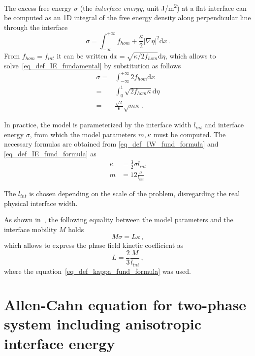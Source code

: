 The excess free energy $\sigma$ (the \textit{interface energy}, unit \unit{\J/\m^2}) at a flat interface can be computed as an 1D integral of the free energy density  along perpendicular line through the interface
\begin{equation} \label{eq_def_IE_fundamental}
	\sigma = \int_{-\infty}^{+\infty} f_{hom} + \frac{\kappa}{2}|\nabla\eta|^2 \mathrm{d}x \,.
\end{equation}
From $f_{hom}=f_{int}$ it can be written $\mathrm{d}x = \sqrt{\kappa/2 f_{hom}}\mathrm{d}\eta$, which allows to solve~\eqref{eq_def_IE_fundamental} by substitution as follows
\begin{align} 
	\sigma =& \int_{-\infty}^{+\infty} 2f_{hom} \mathrm{d}x \\
			=& \int_{0}^{1} \sqrt{2 f_{hom}\kappa} \mathrm{d}\eta \\ 
\label{eq_def_IE_fund_formula}			
			=& \frac{\sqrt{2}}{6}\sqrt{m\kappa}  \,. 
\end{align}

In practice, the model is parameterized by the interface width $l_{int}$ and interface energy $\sigma$, from which the model parameters $m,\kappa $ must be computed. The necessary formulas are obtained from \eqref{eq_def_IW_fund_formula} and \eqref{eq_def_IE_fund_formula} as
\begin{align}
\label{eq_def_kappa_fund_formula} 	\kappa 	&= \frac{3}{2}\sigma l_{int} \\
			m 		&= 12\frac{\sigma}{l_{int}}
\end{align}

The $l_{int}$ is chosen depending on the scale of the problem, disregarding the real physical interface width. 

As shown in~\cite{Moelans2008}, the following equality between the model parameters and the interface mobility $M$ holds
\begin{equation}
	M\sigma = L\kappa \,,
\end{equation}
which allows to express the phase field kinetic coefficient as
\begin{equation}\label{eq_def_L_fund_formula}
	L = \frac{2}{3}\frac{M}{l_{int}}\,,
\end{equation}
where the equation~\eqref{eq_def_kappa_fund_formula} was used.


\section{Allen-Cahn equation for two-phase system including anisotropic interface energy}
